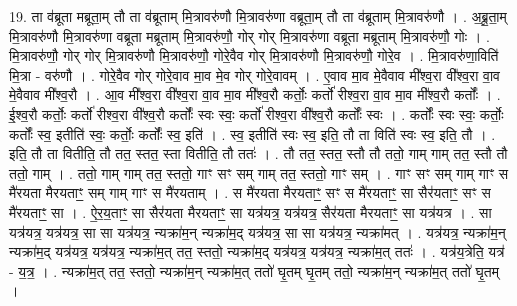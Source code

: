 \documentclass[17pt]{extarticle}
\begin{document}
19. ता व॑ब्रूता मब्रूता॒म् तौ ता व॑ब्रूताम् मि॒त्रावरु॑णौ मि॒त्रावरु॑णा वब्रूता॒म् तौ ता व॑ब्रूताम् मि॒त्रावरु॑णौ । . अ॒ब्रू॒ता॒म् मि॒त्रावरु॑णौ मि॒त्रावरु॑णा वब्रूता मब्रूताम् मि॒त्रावरु॑णौ॒ गोर् गोर् मि॒त्रावरु॑णा वब्रूता मब्रूताम् मि॒त्रावरु॑णौ॒ गोः । . मि॒त्रावरु॑णौ॒ गोर् गोर् मि॒त्रावरु॑णौ मि॒त्रावरु॑णौ॒ गोरे॒वैव गोर् मि॒त्रावरु॑णौ मि॒त्रावरु॑णौ॒ गोरे॒व । . मि॒त्रावरु॑णा॒विति॑ मि॒त्रा - वरु॑णौ । . गोरे॒वैव गोर् गोरे॒वाव मा॒व मे॒व गोर् गोरे॒वावम् । . ए॒वाव मा॒व मे॒वैवाव मी᳚श्व॒रा वी᳚श्व॒रा वा॒व मे॒वैवाव मी᳚श्व॒रौ । . आ॒व मी᳚श्व॒रा वी᳚श्व॒रा वा॒व मा॒व मी᳚श्व॒रौ कर्तोः॒ कर्तो॑ रीश्व॒रा वा॒व मा॒व मी᳚श्व॒रौ कर्तोः᳚ । . ई॒श्व॒रौ कर्तोः॒ कर्तो॑ रीश्व॒रा वी᳚श्व॒रौ कर्तोः᳚ स्वः स्वः॒ कर्तो॑ रीश्व॒रा वी᳚श्व॒रौ कर्तोः᳚ स्वः । . कर्तोः᳚ स्वः स्वः॒ कर्तोः॒ कर्तोः᳚ स्व॒ इतीति॑ स्वः॒ कर्तोः॒ कर्तोः᳚ स्व॒ इति॑ । . स्व॒ इतीति॑ स्वः स्व॒ इति॒ तौ ता विति॑ स्वः स्व॒ इति॒ तौ । . इति॒ तौ ता वितीति॒ तौ तत॒ स्तत॒ स्ता वितीति॒ तौ ततः॑ । . तौ तत॒ स्तत॒ स्तौ तौ ततो॒ गाम् गाम् तत॒ स्तौ तौ ततो॒ गाम् । . ततो॒ गाम् गाम् तत॒ स्ततो॒ गाꣳ सꣳ सम् गाम् तत॒ स्ततो॒ गाꣳ सम् । . गाꣳ सꣳ सम् गाम् गाꣳ स मै॑रयता मैरयताꣳ॒॒ सम् गाम् गाꣳ स मै॑रयताम् । . स मै॑रयता मैरयताꣳ॒॒ सꣳ स मै॑रयताꣳ॒॒ सा सैर॑यताꣳ॒॒ सꣳ स मै॑रयताꣳ॒॒ सा । . ऐ॒र॒य॒ताꣳ॒॒ सा सैर॑यता मैरयताꣳ॒॒ सा यत्र॑यत्र॒ यत्र॑यत्र॒ सैर॑यता मैरयताꣳ॒॒ सा यत्र॑यत्र । . सा यत्र॑यत्र॒ यत्र॑यत्र॒ सा सा यत्र॑यत्र॒ न्यक्रा॑म॒न् न्यक्रा॑म॒द् यत्र॑यत्र॒ सा सा यत्र॑यत्र॒ न्यक्रा॑मत् । . यत्र॑यत्र॒ न्यक्रा॑म॒न् न्यक्रा॑म॒द् यत्र॑यत्र॒ यत्र॑यत्र॒ न्यक्रा॑म॒त् तत॒ स्ततो॒ न्यक्रा॑म॒द् यत्र॑यत्र॒ यत्र॑यत्र॒ न्यक्रा॑म॒त् ततः॑ । . यत्र॑य॒त्रेति॒ यत्र॑ - य॒त्र॒ । . न्यक्रा॑म॒त् तत॒ स्ततो॒ न्यक्रा॑म॒न् न्यक्रा॑म॒त् ततो॑ घृ॒तम् घृ॒तम् ततो॒ न्यक्रा॑म॒न् न्यक्रा॑म॒त् ततो॑ घृ॒तम् । \newline
\end{document}
